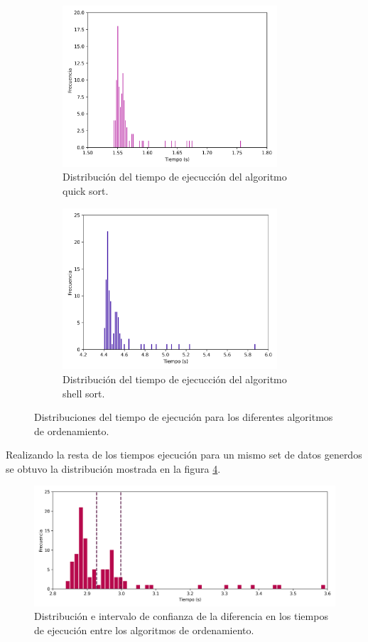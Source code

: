 \begin{figure}[H]
    \centering
    \begin{subfigure}[b]{8cm}
        \centering
        \includegraphics[width=8cm]{Graphics/quick_sort.png}
        \caption{Distribución del tiempo de ejecucción del algoritmo quick sort.}
        \label{fig:quick_sort}
    \end{subfigure}
    \hspace{0.5cm}
    \begin{subfigure}[b]{8cm}
        \centering
        \includegraphics[width=8cm]{Graphics/shell_sort.png}
        \caption{Distribución del tiempo de ejecucción del algoritmo shell sort.}
        \label{fig:shell_sort}
    \end{subfigure}
    \caption{Distribuciones del tiempo de ejecución para los diferentes algoritmos de ordenamiento.}
    \label{fig:time_sort}
\end{figure}

Realizando la resta de los tiempos ejecución para un mismo set de datos generdos se obtuvo la distribución mostrada en la figura \ref{fig:diff_problema4}.

\begin{figure}[H]
    \centering
    \includegraphics[width=13cm]{Graphics/diff.png}
    \caption{Distribución e intervalo de confianza de la diferencia en los tiempos de ejecución entre los algoritmos de ordenamiento. }
    \label{fig:diff_problema4}
\end{figure}

